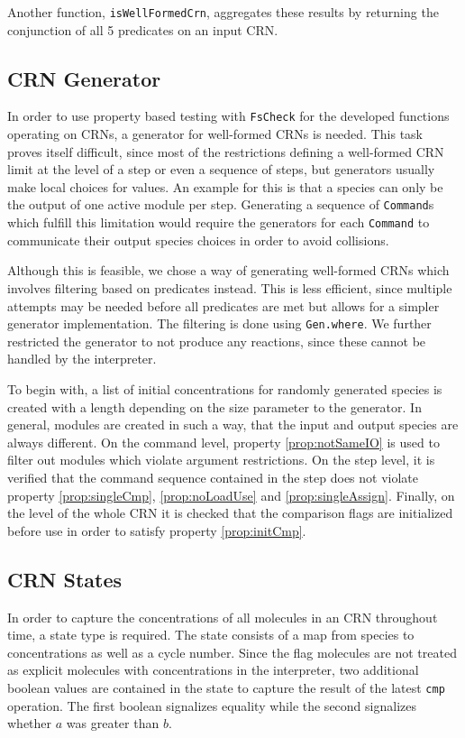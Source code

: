 Another function, \texttt{isWellFormedCrn}, aggregates these results by returning the conjunction of all 5 predicates on an input CRN. 

\subsection{CRN Generator} %
In order to use property based testing with \texttt{FsCheck} \cite{fscheck} for the developed functions operating on CRNs, a generator for well-formed CRNs is needed. This task proves itself difficult, since most of the restrictions defining a well-formed CRN limit at the level of a step or even a sequence of steps, but generators usually make local choices for values. An example for this is that a species can only be the output of one active module per step. Generating a sequence of \texttt{Command}s which fulfill this limitation would require the generators for each \texttt{Command} to communicate their output species choices in order to avoid collisions. 

Although this is feasible, we chose a way of generating well-formed CRNs which involves filtering based on predicates instead. This is less efficient, since multiple attempts may be needed before all predicates are met but allows for a simpler generator implementation. The filtering is done using \texttt{Gen.where}. We further restricted the generator to not produce any reactions, since these cannot be handled by the interpreter.

To begin with, a list of initial concentrations for randomly generated species is created with a length depending on the size parameter to the generator. In general, modules are created in such a way, that the input and output species are always different. On the command level, property \ref{prop:notSameIO} is used to filter out modules which violate argument restrictions. On the step level, it is verified that the command sequence contained in the step does not violate property \ref{prop:singleCmp}, \ref{prop:noLoadUse} and \ref{prop:singleAssign}. Finally, on the level of the whole CRN it is checked that the comparison flags are initialized before use in order to satisfy property \ref{prop:initCmp}.

\subsection{CRN States}\label{sec:states} %
In order to capture the concentrations of all molecules in an CRN throughout time, a state type is required. The state consists of a map from species to concentrations as well as a cycle number. Since the flag molecules are not treated as explicit molecules with concentrations in the interpreter, two additional boolean values are contained in the state to capture the result of the latest \texttt{cmp} operation. The first boolean signalizes equality while the second signalizes whether $a$ was greater than $b$. 

